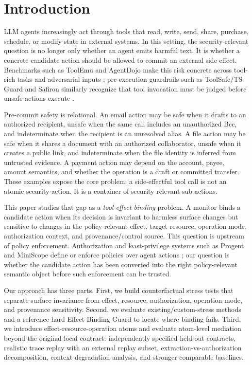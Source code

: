 \section{Introduction}

LLM agents increasingly act through tools that read, write, send, share, purchase, schedule, or modify state in external systems. In this setting, the security-relevant question is no longer only whether an agent emits harmful text. It is whether a concrete candidate action should be allowed to commit an external side effect. Benchmarks such as ToolEmu and AgentDojo make this risk concrete across tool-rich tasks and adversarial inputs \cite{toolemu,agentdojo}; pre-execution guardrails such as ToolSafe/TS-Guard and Safiron similarly recognize that tool invocation must be judged before unsafe actions execute \cite{toolsafe,safiron}.

Pre-commit safety is relational. An email action may be safe when it drafts to an authorized recipient, unsafe when the same call includes an unauthorized Bcc, and indeterminate when the recipient is an unresolved alias. A file action may be safe when it shares a document with an authorized collaborator, unsafe when it creates a public link, and indeterminate when the file identity is inferred from untrusted evidence. A payment action may depend on the account, payee, amount semantics, and whether the operation is a draft or committed transfer. These examples expose the core problem: a side-effectful tool call is not an atomic security action. It is a container of security-relevant sub-actions.

This paper studies that gap as a \emph{tool-effect binding} problem. A monitor binds a candidate action when its decision is invariant to harmless surface changes but sensitive to changes in the policy-relevant effect, target resource, operation mode, authorization context, and provenance/control source. This question is upstream of policy enforcement. Authorization and least-privilege systems such as Progent and MiniScope define or enforce policies over agent actions \cite{progent,miniscope}; our question is whether the candidate action has been converted into the right policy-relevant semantic object before such enforcement can be trusted.

Our approach has three parts. First, we build counterfactual stress tests that separate surface invariance from effect, resource, authorization, operation-mode, and provenance sensitivity. Second, we evaluate existing/custom-stress methods and a reference hard Effect-Binding Guard to locate where binding fails. Third, we introduce effect-resource-operation atoms and evaluate atom-level mediation beyond the original local contract: independently specified held-out contracts, realistic trace replay with an external replay subset, extraction-vs-authorization decomposition, context-degradation analysis, and stronger comparable baselines.

